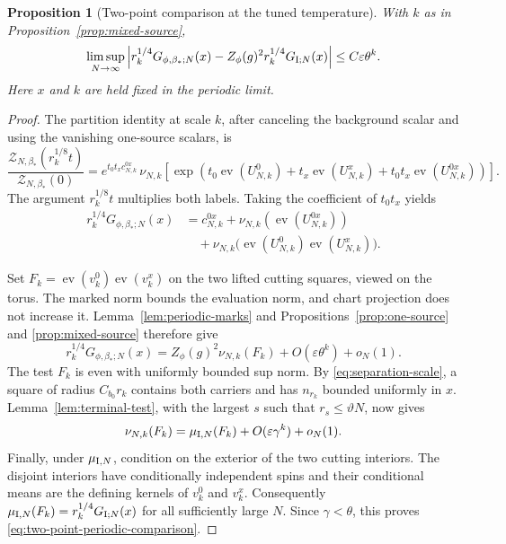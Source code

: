 \documentclass[11pt]{article}
\newtheorem{proposition}{Proposition}[section]
\theoremstyle{definition}
\begin{document}
\begin{proposition}[Two-point comparison at the tuned temperature]
\label{prop:two-point-comparison}
With \(k\) as in Proposition~\ref{prop:mixed-source},
\begin{equation}
 \limsup_{N\to\infty}
 \left|r_k^{1/4}G_{\phi,\beta_*;N}(x)-
 Z_\phi(g)^2 r_k^{1/4}G_{{\rm I};N}(x)\right|
 \le C\varepsilon\theta^k.
 \label{eq:two-point-periodic-comparison}
\end{equation}
Here \(x\) and \(k\) are held fixed in the periodic limit.
\end{proposition}

\begin{proof}
The partition identity at scale \(k\), after canceling the
background scalar and using the vanishing one-source scalars,
is
\[
 \frac{\mathcal Z_{N,\beta_*}(r_k^{1/8}t)}
      {\mathcal Z_{N,\beta_*}(0)}
 = e^{t_0t_xc_{N,k}^{0x}}\,
    \nu_{N,k}\!\left[
     \exp\!\left(t_0\operatorname{ev}(U_{N,k}^0)
             +t_x\operatorname{ev}(U_{N,k}^x)
             +t_0t_x\operatorname{ev}(U_{N,k}^{0x})\right)\right].
\]
The argument \(r_k^{1/8}t\) multiplies both labels.
Taking the coefficient of \(t_0t_x\) yields
\begin{equation}
 \begin{split}
 r_k^{1/4}G_{\phi,\beta_*;N}(x)
 &=c_{N,k}^{0x}
   +\nu_{N,k}(\operatorname{ev}(U_{N,k}^{0x}))\\
 &\quad+\nu_{N,k}\bigl(
    \operatorname{ev}(U_{N,k}^0)\operatorname{ev}(U_{N,k}^x)\bigr).
 \end{split}
 \label{eq:direct-two-source-exact}
\end{equation}

Set \(F_k=\operatorname{ev}(v_k^0)\operatorname{ev}(v_k^x)\)
on the two lifted cutting squares, viewed on the torus.
The marked norm bounds the evaluation norm, and chart projection
does not increase it. Lemma~\ref{lem:periodic-marks} and
Propositions~\ref{prop:one-source} and \ref{prop:mixed-source}
therefore give
\[
 r_k^{1/4}G_{\phi,\beta_*;N}(x)
   =Z_\phi(g)^2\nu_{N,k}(F_k)
      +O(\varepsilon\theta^k)+o_N(1).
\]
The test \(F_k\) is even with uniformly bounded sup norm.
By \eqref{eq:separation-scale}, a square of radius \(C_{b_0}r_k\)
contains both carriers and has \(n_{r_k}\) bounded uniformly
in \(x\). Lemma~\ref{lem:terminal-test}, with the largest \(s\)
such that \(r_s\le\vartheta N\), now gives
\[
 \nu_{N,k}(F_k)=\mu_{{\rm I},N}(F_k)+
 O(\varepsilon\gamma^k)+o_N(1).
\]
Finally, under \(\mu_{{\rm I},N}\), condition on the exterior
of the two cutting interiors. The disjoint interiors have
conditionally independent spins and their conditional means are
the defining kernels of \(v_k^0\) and \(v_k^x\).
Consequently \(\mu_{{\rm I},N}(F_k)=r_k^{1/4}G_{{\rm I};N}(x)\)
for all sufficiently large \(N\). Since \(\gamma<\theta\),
this proves \eqref{eq:two-point-periodic-comparison}.
\end{proof}
\end{document}
